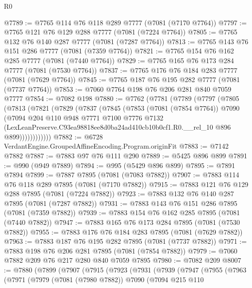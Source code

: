 \begin{lexlean}{R0}
\begin{coremodule}
@7789 := @7765 @114 @76 @118 @289 @7777 (@7081 (@7170 @7764))
@7797 := @7765 @121 @76 @129 @288 @7777 (@7081 (@7224 @7764))
@7805 := @7765 @132 @76 @140 @287 @7777 (@7081 (@7287 @7764))
@7813 := @7765 @143 @76 @151 @286 @7777 (@7081 (@7359 @7764))
@7821 := @7765 @154 @76 @162 @285 @7777 (@7081 (@7440 @7764))
@7829 := @7765 @165 @76 @173 @284 @7777 (@7081 (@7530 @7764))
@7837 := @7765 @176 @76 @184 @283 @7777 (@7081 (@7629 @7764))
@7845 := @7765 @187 @76 @195 @282 @7777 (@7081 (@7737 @7764))
@7853 := @7060 @7764 @198 @76 @206 @281 @840 @7059 @7777
@7854 := @7082 @198
@7880 := @7762
    (@7781
      (@7789
        (@7797
          (@7805
            (@7813
              (@7821
                (@7829
                  (@7837
                    (@7845
                      (@7853
                        (@7081 (@7854 @7764))
                        @7090
                        (@7094
                          @204
                          @110
                          @948
                          @7771
                          @7100
                          @7776
                          @7132
                          (LexLeanPreserve.C93ea98818ee8d0ba24ad410cb10b0cf1.R0.__rel_10
                            @896
                            @899))))))))))))
@7882 := @6728 VerdantEngine.GroupedAffineEncoding.Program.originFit
@7883 := @7142 @7882
@7887 := @7883 @97 @76 @111 @290
@7889 := @5425 @896 @899
@7891 := @990 (@949 @7889)
@7894 := @995 (@5429 @896 @899)
@7895 := @7891 @7894
@7899 := @7887 @7895 (@7081 (@7083 @7882))
@7907 := @7883 @114 @76 @118 @289 @7895 (@7081 (@7170 @7882))
@7915 := @7883 @121 @76 @129 @288 @7895 (@7081 (@7224 @7882))
@7923 := @7883 @132 @76 @140 @287 @7895 (@7081 (@7287 @7882))
@7931 := @7883 @143 @76 @151 @286 @7895 (@7081 (@7359 @7882))
@7939 := @7883 @154 @76 @162 @285 @7895 (@7081 (@7440 @7882))
@7947 := @7883 @165 @76 @173 @284 @7895 (@7081 (@7530 @7882))
@7955 := @7883 @176 @76 @184 @283 @7895 (@7081 (@7629 @7882))
@7963 := @7883 @187 @76 @195 @282 @7895 (@7081 (@7737 @7882))
@7971 := @7883 @198 @76 @206 @281 @7895 (@7081 (@7854 @7882))
@7979 := @7060 @7882 @209 @76 @217 @280 @840 @7059 @7895
@7980 := @7082 @209
@8007 := @7880
    (@7899
      (@7907
        (@7915
          (@7923
            (@7931
              (@7939
                (@7947
                  (@7955
                    (@7963
                      (@7971
                        (@7979
                          (@7081 (@7980 @7882))
                          @7090
                          (@7094
                            @215
                            @110

\end{coremodule}
\end{lexlean}

